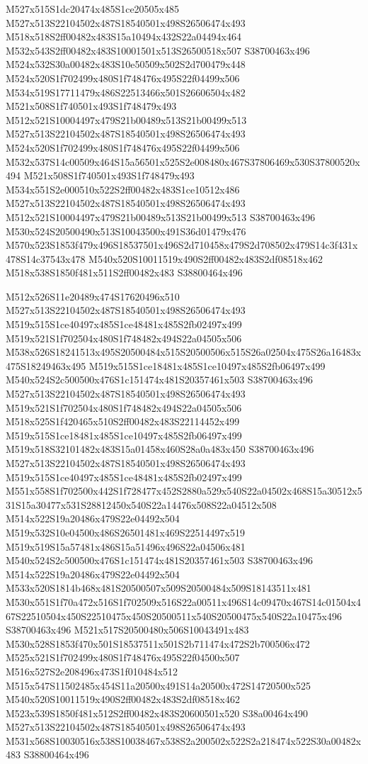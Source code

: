 \documentclass{article}
\begin{document}
\begin{multicols}{2}
M527x515S1dc20474x485S1ce20505x485 M527x513S22104502x487S18540501x498S26506474x493 M518x518S2ff00482x483S15a10494x432S22a04494x464 M532x543S2ff00482x483S10001501x513S26500518x507 S38700463x496 M524x532S30a00482x483S10e50509x502S2d700479x448 M524x520S1f702499x480S1f748476x495S22f04499x506 M534x519S17711479x486S22513466x501S26606504x482 M521x508S1f740501x493S1f748479x493 M512x521S10004497x479S21b00489x513S21b00499x513 M527x513S22104502x487S18540501x498S26506474x493 M524x520S1f702499x480S1f748476x495S22f04499x506 M532x537S14c00509x464S15a56501x525S2e008480x467S37806469x530S37800520x494 M521x508S1f740501x493S1f748479x493 M534x551S2e000510x522S2ff00482x483S1ce10512x486 M527x513S22104502x487S18540501x498S26506474x493 M512x521S10004497x479S21b00489x513S21b00499x513 S38700463x496 M530x524S20500490x513S10043500x491S36d01479x476 M570x523S1853f479x496S18537501x496S2d710458x479S2d708502x479S14c3f431x478S14c37543x478 M540x520S10011519x490S2ff00482x483S2df08518x462 M518x538S1850f481x511S2ff00482x483 S38800464x496

M512x526S11e20489x474S17620496x510 M527x513S22104502x487S18540501x498S26506474x493 M519x515S1ce40497x485S1ce48481x485S2fb02497x499 M519x521S1f702504x480S1f748482x494S22a04505x506 M538x526S18241513x495S20500484x515S20500506x515S26a02504x475S26a16483x475S18249463x495 M519x515S1ce18481x485S1ce10497x485S2fb06497x499 M540x524S2c500500x476S1c151474x481S20357461x503 S38700463x496 M527x513S22104502x487S18540501x498S26506474x493 M519x521S1f702504x480S1f748482x494S22a04505x506 M518x525S1f420465x510S2ff00482x483S22114452x499 M519x515S1ce18481x485S1ce10497x485S2fb06497x499 M519x518S32101482x483S15a01458x460S28a0a483x450 S38700463x496 M527x513S22104502x487S18540501x498S26506474x493 M519x515S1ce40497x485S1ce48481x485S2fb02497x499 M551x558S1f702500x442S1f728477x452S2880a529x540S22a04502x468S15a30512x531S15a30477x531S28812450x540S22a14476x508S22a04512x508 M514x522S19a20486x479S22e04492x504 M519x532S10e04500x486S26501481x469S22514497x519 M519x519S15a57481x486S15a51496x496S22a04506x481 M540x524S2c500500x476S1c151474x481S20357461x503 S38700463x496 M514x522S19a20486x479S22e04492x504 M533x520S1814b468x481S20500507x509S20500484x509S18143511x481 M530x551S1f70a472x516S1f702509x516S22a00511x496S14c09470x467S14c01504x467S22510504x450S22510475x450S20500511x540S20500475x540S22a10475x496 S38700463x496 M521x517S20500480x506S10043491x483 M530x528S1853f470x501S18537511x501S2b711474x472S2b700506x472 M525x521S1f702499x480S1f748476x495S22f04500x507 M516x527S2e208496x473S1f010484x512 M515x547S11502485x454S11a20500x491S14a20500x472S14720500x525 M540x520S10011519x490S2ff00482x483S2df08518x462 M523x539S1850f481x512S2ff00482x483S20600501x520 S38a00464x490 M527x513S22104502x487S18540501x498S26506474x493 M531x568S10030516x538S10038467x538S2a200502x522S2a218474x522S30a00482x483 S38800464x496


\end{multicols}
\end{document}
